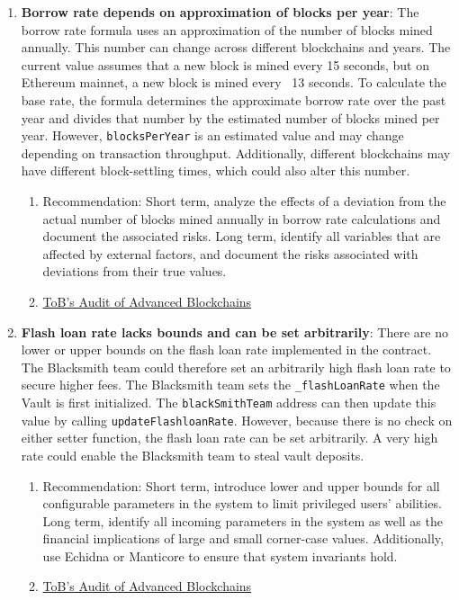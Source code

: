 \begin{enumerate}
\item\textbf{Borrow rate depends on approximation of blocks per year}: The borrow rate formula uses an approximation of the number of blocks mined annually. This number can change across different blockchains and years. The current value assumes that a new block is mined every 15 seconds, but on Ethereum mainnet, a new block is mined every ~13 seconds. To calculate the base rate, the formula determines the approximate borrow rate over the past year and divides that number by the estimated number of blocks mined per year. However, \verb|blocksPerYear| is an estimated value and may change depending on transaction throughput. Additionally, different blockchains may have different block-settling times, which could also alter this number.
	\begin{enumerate}
	\item Recommendation: Short term, analyze the effects of a deviation from the actual number of blocks mined annually in borrow rate calculations and document the associated risks. Long term, identify all variables that are affected by external factors, and document the risks associated with deviations from their true values.
	\item\href{https://github.com/trailofbits/publications/blob/master/reviews/AdvancedBlockchain.pdf}{ToB's Audit of Advanced Blockchains}
	\end{enumerate}

\item\textbf{Flash loan rate lacks bounds and can be set arbitrarily}: There are no lower or upper bounds on the flash loan rate implemented in the contract. The Blacksmith team could therefore set an arbitrarily high flash loan rate to secure higher fees. The Blacksmith team sets the \verb|_flashLoanRate| when the Vault is first initialized. The \verb|blackSmithTeam| address can then update this value by calling \verb|updateFlashloanRate|. However, because there is no check on either setter function, the flash loan rate can be set arbitrarily. A very high rate could enable the Blacksmith team to steal vault deposits.
	\begin{enumerate}
	\item Recommendation: Short term, introduce lower and upper bounds for all configurable parameters in the system to limit privileged users’ abilities. Long term, identify all incoming parameters in the system as well as the financial implications of large and small corner-case values. Additionally, use Echidna or Manticore to ensure that system invariants hold.
	\item\href{https://github.com/trailofbits/publications/blob/master/reviews/AdvancedBlockchain.pdf}{ToB's Audit of Advanced Blockchains}
	\end{enumerate}


\end{enumerate}
